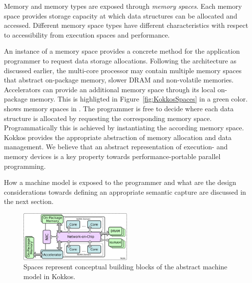 Memory and memory types are exposed through \emph{memory spaces}. Each memory space provides storage capacity at which data structures can be allocated and accessed. Different memory space types have different characteristics with respect to accessibility from execution spaces and performance. 

An instance of a memory space provides a concrete method for the application programmer to request data storage allocations. Following the architecture as discussed earlier, the multi-core processor may contain multiple memory spaces that abstract on-package memory, slower DRAM and non-volatile memories. Accelerators can provide an additional memory space through its local on-package memory. This is highligted in Figure~\ref{fig:KokkosSpaces} in a green color. shows memory spaces in . The programmer is free to decide where each data structure is allocated by requesting the corresponding memory space. Programmatically this is achieved by instantiating the according memory space. Kokkos provides the appropriate abstraction of memory allocation and data management. We believe that an abstract representation of execution- and memory devices is a key property towards performance-portable parallel programming.

How a machine model is exposed to the programmer and what are the design considerations towards defining an appropriate semantic capture are discussed in the next section.


\begin{figure}

\includegraphics[width=0.5\textwidth]{img/KokkosSpaces.png}
\caption{Spaces represent conceptual building blocks of the abstract machine model in Kokkos.}
\label{fig:execspace}
\label{fig:spaces}
\end{figure}
